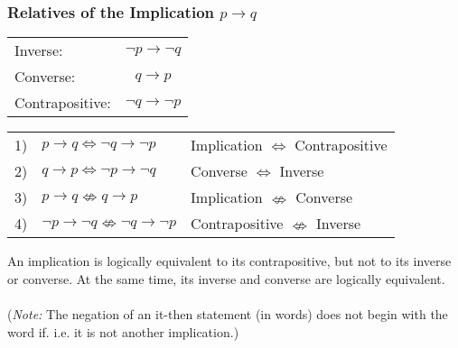 \documentclass[12pt]{article}
\begin{document}
\subsubsection{Relatives of the Implication $p \rightarrow q$}
\begin{tabular}{l c}
Inverse: & $\neg p \rightarrow \neg q$\\
Converse: & $q \rightarrow p$\\
Contrapositive: & $\neg q \rightarrow \neg p$\\
\end{tabular}
\begin{center}
\begin{tabular}{c l l}
1) & $p \rightarrow q \Leftrightarrow \neg q \rightarrow \neg p$ & Implication $\Leftrightarrow$ Contrapositive\\
2) & $q \rightarrow p \Leftrightarrow \neg p \rightarrow \neg q$ & Converse $\Leftrightarrow$ Inverse\\
3) & $p \rightarrow q \nLeftrightarrow q \rightarrow p$ & Implication $\nLeftrightarrow$ Converse\\
4) & $\neg p \rightarrow \neg q \nLeftrightarrow \neg q \rightarrow \neg p$ & Contrapositive $\nLeftrightarrow$ Inverse
\end{tabular}
\end{center}

\noindent An implication is logically equivalent to its contrapositive, but not to its inverse or converse. At the same time, its inverse and converse are logically equivalent. \\\\
(\emph{Note:} The negation of an it-then statement (in words) does not begin with the word if. i.e. it is not another implication.)
\end{document}
